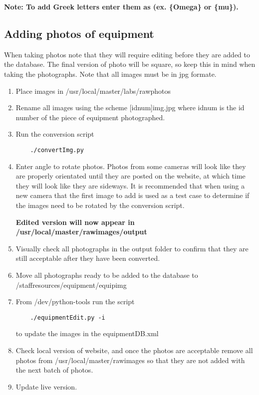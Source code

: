 \documentclass[justified]{book}
\begin{document}
{\bf Note: To add Greek letters enter them as (ex. \{Omega\} or \{mu\}).}




\subsection{Adding photos of equipment}

When taking photos note that they will require editing before they are added to the database. The final version of photo will be square, so keep this in mind when taking the photographs. Note that all images must be in jpg formate.

\begin{enumerate}
\item Place images in /usr/local/master/labs/rawphotos
\item Rename all images using the scheme [idnum]img.jpg where idnum is the id number of the piece of equipment photographed.
\item Run the conversion script

	\begin{lstlisting}
	./convertImg.py       
	\end{lstlisting}

\item Enter angle to rotate photos. Photos from some cameras will look like they are properly orientated until they are posted on the website, at which time they will look like they are sideways. It is recommended that when using a new camera that the first image to add is used as a test case to determine if the images need to be rotated by the conversion script.

{\bf Edited version will now appear in /usr/local/master/rawimages/output}

\item Visually check all photographs in the output folder to confirm that they are still acceptable after they have been converted.

\item Move all photographs ready to be added to the database to /staffresources/equipment/equipimg
\item From /dev/python-tools run the script

	\begin{lstlisting}
	./equipmentEdit.py -i
	\end{lstlisting}

to update the images in the equipmentDB.xml

\item Check local version of website, and once the photos are acceptable remove all photos from /usr/local/master/rawimages so that they are not added with the next batch of photos.

\item Update live version.
\end{enumerate}
\end{document}
